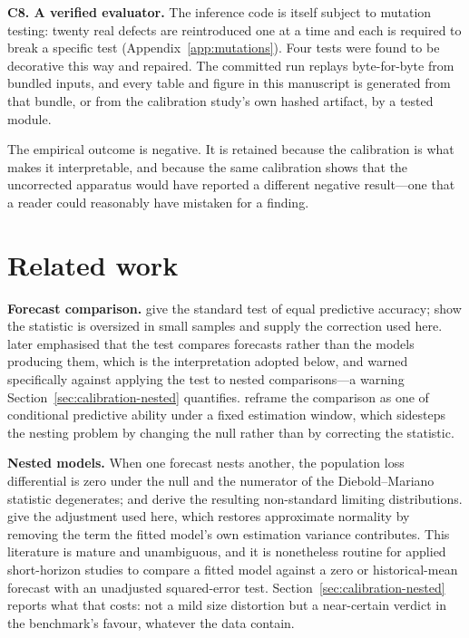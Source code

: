 \documentclass{article}
\theoremstyle{plain}
\theoremstyle{remark}
\begin{document}
\textbf{C8. A verified evaluator.} The inference code is itself subject to
mutation testing: twenty real defects are reintroduced one at a time and each
is required to break a specific test (Appendix~\ref{app:mutations}). Four tests
were found to be decorative this way and repaired. The committed run replays
byte-for-byte from bundled inputs, and every table and figure in this manuscript
is generated from that bundle, or from the calibration study's own hashed
artifact, by a tested module.

The empirical outcome is negative. It is retained because the calibration is
what makes it interpretable, and because the same calibration shows that the
uncorrected apparatus would have reported a different negative result---one
that a reader could reasonably have mistaken for a finding.

\section{Related work}

\textbf{Forecast comparison.} \citet{diebold1995} give the standard test of
equal predictive accuracy; \citet{harvey1997} show the statistic is oversized in
small samples and supply the correction used here. \citet{diebold2015} later
emphasised that the test compares forecasts rather than the models producing
them, which is the interpretation adopted below, and warned specifically against
applying the test to nested comparisons---a warning Section~\ref{sec:calibration-nested}
quantifies. \citet{giacomini2006} reframe the comparison as one of conditional
predictive ability under a fixed estimation window, which sidesteps the nesting
problem by changing the null rather than by correcting the statistic.

\textbf{Nested models.} When one forecast nests another, the population loss
differential is zero under the null and the numerator of the Diebold--Mariano
statistic degenerates; \citet{clark2001} and \citet{mccracken2007} derive the
resulting non-standard limiting distributions. \citet{clark2007} give the
adjustment used here, which restores approximate normality by removing the term
the fitted model's own estimation variance contributes. This literature is
mature and unambiguous, and it is nonetheless routine for applied short-horizon
studies to compare a fitted model against a zero or historical-mean forecast
with an unadjusted squared-error test. Section~\ref{sec:calibration-nested}
reports what that costs: not a mild size distortion but a near-certain verdict
in the benchmark's favour, whatever the data contain.
\end{document}
